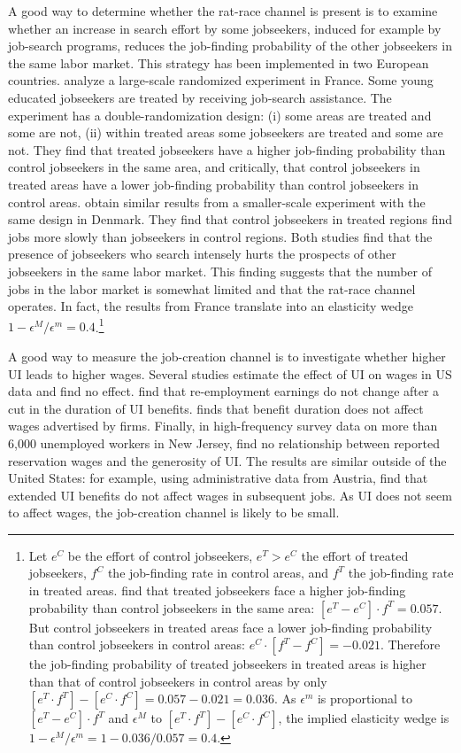 \documentclass[letterpaper,12pt,leqno]{article}
\newcommand{\brk}[1]{\left[ #1 \right]}
\def \e{{\epsilon}}
\begin{document}
A good way to determine whether the rat-race channel is present is to examine whether an increase in search effort by some jobseekers, induced for example by job-search programs, reduces the job-finding probability of the other jobseekers in the same labor market. This strategy has been implemented in two European countries. \citet{CDG12} analyze a large-scale randomized experiment in France. Some young educated jobseekers are treated by receiving job-search assistance. The experiment has a double-randomization design: (i) some areas are treated and some are not, (ii) within treated areas some jobseekers are treated and some are not. They find that treated jobseekers have a higher job-finding probability than control jobseekers in the same area, and critically, that control jobseekers in treated areas have a lower job-finding probability than control jobseekers in control areas. \citet{GMK12} obtain similar results from a smaller-scale experiment with the same design in Denmark. They find that control jobseekers in treated regions find jobs more slowly than jobseekers in control regions. Both studies find that the presence of jobseekers who search intensely hurts the prospects of other jobseekers in the same labor market. This finding suggests that the number of jobs in the labor market is somewhat limited and that the rat-race channel operates. In fact, the results from France translate into an elasticity wedge $1-\e^{M}/\e^{m}=0.4$.\footnote{Let $e^{C}$ be the effort of control jobseekers, $e^{T}>e^C$ the effort of treated jobseekers, $f^C$ the job-finding rate in control areas, and $f^T$ the job-finding rate in treated areas. \citet[Table~IX, panel~B, column~1]{CDG12} find that treated jobseekers face a higher job-finding probability than control jobseekers in the same area: $\brk{e^{T}-e^{C}}\cdot f^T=0.057$. But control jobseekers in treated areas face a lower job-finding probability than control jobseekers in control areas: $e^{C}\cdot \brk{f^T-f^C}=-0.021$. Therefore the job-finding probability of treated jobseekers in treated areas is higher than that of control jobseekers in control areas by only $\brk{e^{T}\cdot f^T}-\brk{e^{C}\cdot f^C}=0.057-0.021=0.036$. As $\e^{m}$ is proportional to $\brk{e^{T}-e^{C}}\cdot f^T$ and $\e^{M}$ to $\brk{e^{T}\cdot f^T}-\brk{e^{C}\cdot f^C}$, the implied elasticity wedge is $1-\e^{M}/\e^{m}=1-0.036/0.057=0.4$.}

A good way to measure the job-creation channel is to investigate whether higher UI leads to higher wages. Several studies estimate the effect of UI on wages in US data and find no effect. \citet[p.~21]{JM15} find that re-employment earnings do not change after a cut in the duration of UI benefits. \citet[p.~23]{M14} finds that benefit duration does not affect wages advertised by firms. Finally, in high-frequency survey data on more than 6,000 unemployed workers in New Jersey, \citet[p.~175]{KM16} find no relationship between reported reservation wages and the generosity of UI. The results are similar outside of the United States: for example, using administrative data from Austria, \citet[p.~1514]{CCW07} find that extended UI benefits do not affect wages in subsequent jobs. As UI does not seem to affect wages, the job-creation channel is likely to be small.
\end{document}
